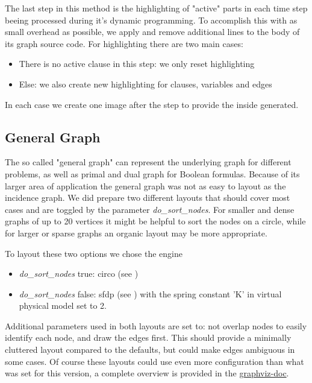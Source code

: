 \documentclass[a4paper, 12pt]{scrartcl}
\begin{document}
The last step in this method is the highlighting of "active" parts in each time step beeing processed during it's dynamic programming. To accomplish this with as small overhead as possible, we apply and remove additional lines to the body of its graph source code. 
For highlighting there are two main cases:
\begin{itemize}
	\item There is no active clause in this step: we only reset highlighting
	\item Else: we also create new highlighting for clauses, variables and edges
\end{itemize}
In each case we create one image after the step to provide the inside generated.

\subsection{General Graph}
The so called "general graph" can represent the underlying graph for different problems, as well as primal and dual graph for Boolean formulas.
Because of its larger area of application the general graph was not as easy to layout as the incidence graph.
We did prepare two different layouts that should cover most cases and are toggled by the parameter \textit{do\_sort\_nodes}.
For smaller and dense graphs of up to 20 vertices it might be helpful to sort the nodes on a circle, while for larger or sparse graphs an organic layout may be more appropriate.

To layout these two options we chose the engine 
\begin{itemize}
	\item \textit{do\_sort\_nodes} true: circo (see \cite{ST99})
	\item \textit{do\_sort\_nodes} false: sfdp (see \cite{Hu05}) with the spring constant 'K' in virtual physical model set to 2.
\end{itemize}

Additional parameters used in both layouts are set to: not overlap nodes to easily identify each node, and draw the edges first. This should provide a minimally cluttered layout compared to the defaults, but could make edges ambiguous in some cases. Of course these layouts could use even more configuration than what was set for this version, a complete overview is provided in the \href{https://graphviz.org/doc/info/attrs.html}{graphviz-doc}. 
\end{document}
